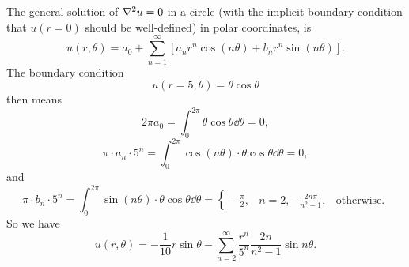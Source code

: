 \documentclass[hyperref, a4paper]{article}
\def\\{}%
\begin{document}
\section{}

The general solution of $\laplacian u = 0$ in a circle 
(with the implicit boundary condition that $u(r=0)$ should be well-defined)
in polar coordinates, is 
\begin{equation}
    u(r, \theta)=a_0+\sum_{n=1}^{\infty}\left[a_n r^n \cos (n \theta)+b_n r^n \sin (n \theta)\right].
\end{equation}
The boundary condition 
\begin{equation}
    u(r = 5, \theta) = \theta \cos \theta
\end{equation}
then means 
\begin{equation}
    2\pi a_0 = \int_{0}^{2\pi} \theta \cos \theta \dd{\theta} = 0,
\end{equation}
\begin{equation}
    \pi \cdot a_n \cdot 5^n = \int_{0}^{2\pi} \cos(n \theta) \cdot \theta \cos \theta \dd{\theta} = 0,
\end{equation}
and 
\begin{equation}
    \pi \cdot b_n \cdot 5^n = \int_{0}^{2\pi} \sin(n \theta) \cdot \theta \cos \theta \dd{\theta} 
    = \begin{cases}
        - \frac{\pi}{2}, &n = 2, \\
        - \frac{2n \pi}{n^2 - 1}, & \text{otherwise}.
    \end{cases}
\end{equation}
So we have 
\begin{equation}
    u(r, \theta) = - \frac{1}{10} r \sin \theta - \sum_{n=2}^{\infty} \frac{r^n}{5^n} \frac{2n}{n^2 - 1} \sin n \theta.
\end{equation}
\end{document}
